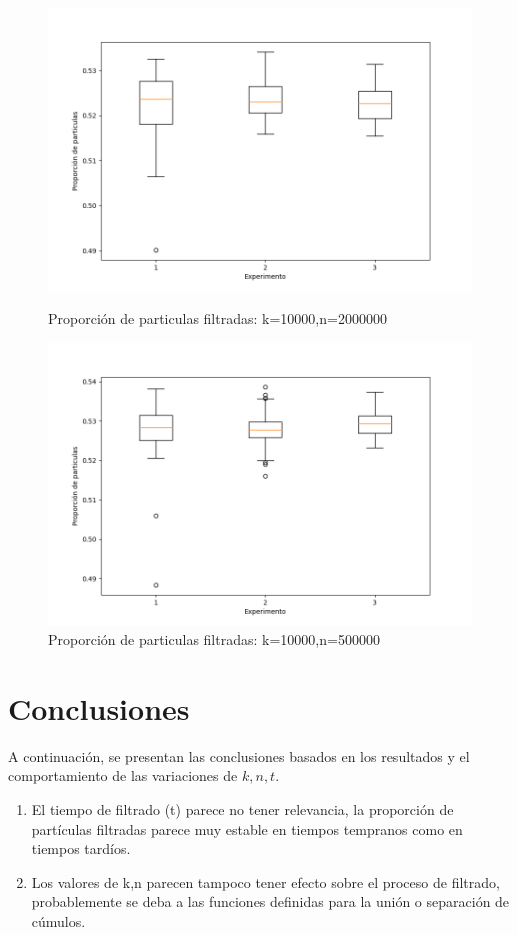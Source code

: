 \documentclass{article}
\begin{document}
\newpage
\begin{figure}[h!]
	\centering
	\includegraphics[width=0.5\linewidth]{bx_4.png}
	\caption{Proporción de particulas filtradas: k=10000,n=2000000}
	\label{fig:bx5}
	
	\includegraphics[width=0.5\linewidth]{bx_5.png}
	\caption{Proporción de particulas filtradas: k=10000,n=500000}
	\label{fig:bx6}
\end{figure}

	\section{Conclusiones}
	A continuación, se presentan las conclusiones basados en los resultados y el comportamiento de las variaciones de $k,n,t$.
	
	\begin{enumerate}
		\item  El tiempo de filtrado (t) parece no tener relevancia, la proporción de partículas filtradas parece muy estable en tiempos tempranos como en tiempos tardíos.
		\item Los valores de k,n parecen tampoco tener efecto sobre el proceso de filtrado, probablemente se deba a las funciones definidas para la unión o separación de cúmulos.
		
		
	\end{enumerate}



\end{document}
